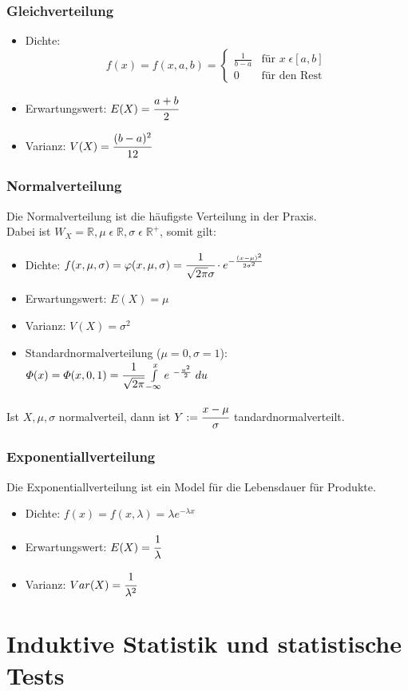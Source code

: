 \documentclass[a4paper]{scrartcl}
\begin{document}
            \subsubsection{Gleichverteilung}
            \begin{itemize}
                \item Dichte: \[f(x) = f(x,a,b)=
                                \begin{cases}
                                    \frac{1}{b - a}     & \text{für } x \; \epsilon [a, b] \\
                                    0     & \text{für den Rest} 
                                \end{cases}
                            \] 
                \item Erwartungswert: \(E(X) = \cfrac{a+b}{2} \)
                \item Varianz: \(V(X) = \cfrac{(b-a)^2}{12} \)
            \end{itemize}
            \subsubsection{Normalverteilung}
                Die Normalverteilung ist die häufigste Verteilung in der Praxis.\\
                Dabei ist  \(W_X = \mathbb{R}, \mu \; \epsilon \; \mathbb{R}, \sigma \; \epsilon \; \mathbb{R}^+ \), somit gilt: 
                \begin{itemize}
                    \item Dichte: \( f(x, \mu, \sigma)  = \varphi(x, \mu, \sigma) = \cfrac{1}{\sqrt{2\pi} \sigma} \cdot e^{- \frac{(x - \mu)^2}{2 \sigma^2}} \) 
                    \item Erwartungswert: \(E(X) = \mu\)
                    \item Varianz: \(V(X) = \sigma^2\)
                    \item Standardnormalverteilung (\(\mu = 0, \sigma = 1\)):  \(\varPhi(x) = \varPhi(x,0,1) = \cfrac{1}{\sqrt{2\pi}} \int\limits_{-\infty}^xe^{\ - \frac{u^2}{2}} \; du\)
                \end{itemize}
                Ist \(X, \mu, \sigma\) normalverteil, dann ist \(Y := \cfrac{x - \mu}{\sigma}\) tandardnormalverteilt.
            \subsubsection{Exponentiallverteilung}
                Die Exponentiallverteilung ist ein Model für die Lebensdauer für Produkte.
                \begin{itemize}
                    \item Dichte: \(f(x) = f(x, \lambda) = \lambda e^{-\lambda x}\) 
                    \item Erwartungswert: \(E(X) = \cfrac{1}{\lambda} \)
                    \item Varianz: \(Var(X) =  \cfrac{1}{\lambda^2} \)
                \end{itemize}
    \section{Induktive Statistik und statistische Tests}
\end{document}
